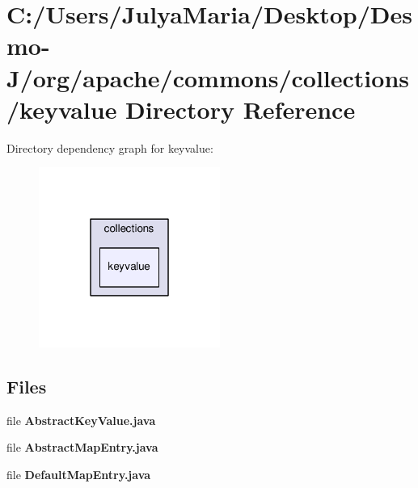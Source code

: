 \section{C\-:/\-Users/\-Julya\-Maria/\-Desktop/\-Desmo-\/\-J/org/apache/commons/collections/keyvalue Directory Reference}
\label{dir_de2a45e222f032fe348dc77783bf1ce5}
Directory dependency graph for keyvalue\-:
\nopagebreak
\begin{figure}[H]
\begin{center}
\leavevmode
\includegraphics[width=168pt]{dir_de2a45e222f032fe348dc77783bf1ce5_dep}
\end{center}
\end{figure}
\subsection*{Files}
\begin{DoxyCompactItemize}
\item 
file {\bfseries Abstract\-Key\-Value.\-java}
\item 
file {\bfseries Abstract\-Map\-Entry.\-java}
\item 
file {\bfseries Default\-Map\-Entry.\-java}
\end{DoxyCompactItemize}
